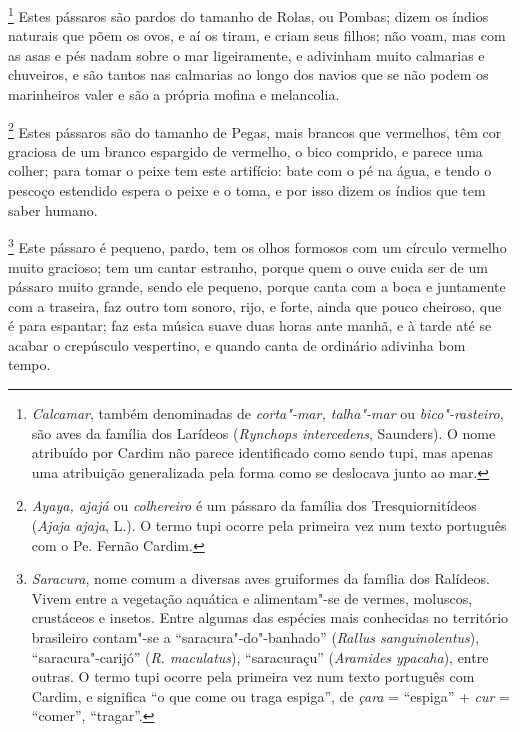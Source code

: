 \begin{linenumbers}
\footnote{ \textit{Calcamar}, também denominadas de
\textit{corta"-mar, talha"-mar} ou \textit{bico"-rasteiro}, são aves da
família dos Larídeos (\textit{Rynchops intercedens}, Saunders). O nome
atribuído por Cardim não parece identificado como sendo tupi, mas
apenas uma atribuição generalizada pela forma como se deslocava junto
ao mar.} Estes pássaros são pardos do tamanho de Rolas, ou
Pombas; dizem os índios naturais que põem os ovos, e aí os tiram, e
criam seus filhos; não voam, mas com as asas e pés nadam sobre o mar
ligeiramente, e adivinham muito calmarias e chuveiros, e são tantos nas
calmarias ao longo dos navios que se não podem os marinheiros valer e
são a própria mofina e melancolia.

\footnote{ \textit{Ayaya, ajajá} ou \textit{colhereiro}
é um pássaro da família dos Tresquiornitídeos (\textit{Ajaja
ajaja}, L.). O termo tupi ocorre pela primeira vez num texto português
com o Pe. Fernão Cardim.} Estes pássaros são do tamanho de
Pegas, mais brancos que vermelhos, têm cor graciosa de um branco
espargido de vermelho, o bico comprido, e parece uma colher; para tomar
o peixe tem este artifício: bate com o pé na água, e tendo o pescoço
estendido espera o peixe e o toma, e por isso dizem os índios que tem
saber humano.

\footnote{ \textit{Saracura}, nome comum a diversas
aves gruiformes da família dos Ralídeos. Vivem entre a vegetação
aquática e alimentam"-se de vermes, moluscos, crustáceos e insetos.
Entre algumas das espécies mais conhecidas no território brasileiro
contam"-se a ``saracura"-do"-banhado'' (\textit{Rallus sanguinolentus}), 
``saracura"-carijó'' (\textit{R. maculatus}), ``saracuraçu'' 
(\textit{Aramides ypacaha}), entre outras. O termo tupi ocorre pela
primeira vez num texto português com Cardim, e significa ``o que come
ou traga espiga'', de \textit{çara} = ``espiga'' + \textit{cur} = 
``comer'', ``tragar''.} Este pássaro é pequeno, pardo, tem os
olhos formosos com um círculo vermelho muito gracioso; tem um cantar
estranho, porque quem o ouve cuida ser de um pássaro muito grande,
sendo ele pequeno, porque canta com a boca e juntamente com a traseira,
faz outro tom sonoro, rijo, e forte, ainda que pouco cheiroso, que é
para espantar; faz esta música suave duas horas ante manhã, e à tarde
até se acabar o crepúsculo vespertino, e quando canta de ordinário
adivinha bom tempo.


\end{linenumbers}
